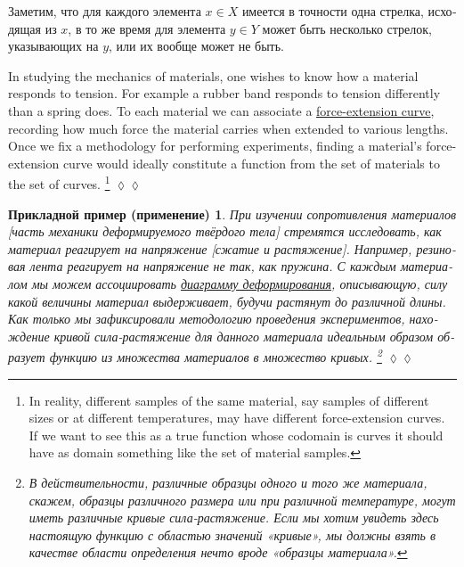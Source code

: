 \documentclass[a4paper]{book}
\theoremstyle{myth}
\newtheorem{appENG}[envENG]{\begin{english}Application\end{english}}
\newenvironment{applicationENG}{\begin{appENG}}{\hspace*{\fill}$\lozenge\lozenge$\end{appENG}}
\newtheorem{appRUS}[envRUS]{Прикладной пример (применение)}
\newenvironment{applicationRUS}{\begin{appRUS}}{\hspace*{\fill}$\lozenge\lozenge$\end{appRUS}}
\begin{document}
\begin{russian}
Заметим, что для каждого элемента $x\in X$ имеется в точности одна стрелка, исходящая из $x$, в то же время для элемента $y\in Y$ может быть несколько стрелок, указывающих на $y$, или их вообще может не быть.

\begin{applicationENG}\label{app:force-extension}
In studying the mechanics of materials, one wishes to know how a material responds to tension. For example a rubber band responds to tension differently than a spring does. To each material we can associate a \href{http://en.wikipedia.org/wiki/Stress–strain_curve}{\text force-extension curve}, recording how much force the material carries when extended to various lengths. Once we fix a methodology for performing experiments, finding a material's force-extension curve would ideally constitute a function from the set of materials to the set of curves.%
\footnote{In reality, different samples of the same material, say samples of different sizes or at different temperatures, may have different force-extension curves. If we want to see this as a true function whose codomain is curves it should have as domain something like the set of material samples.}
\end{applicationENG}

\begin{applicationRUS}\label{app:force-extension}
При изучении сопротивления материалов [часть механики деформируемого твёрдого тела] стремятся исследовать, как материал реагирует на напряжение [сжатие и растяжение]. Например, резиновая лента реагирует на напряжение не так, как пружина. С каждым материалом мы можем ассоциировать \href{https://ru.wikipedia.org/wiki/%D0%94%D0%B8%D0%B0%D0%B3%D1%80%D0%B0%D0%BC%D0%BC%D0%B0_%D0%B4%D0%B5%D1%84%D0%BE%D1%80%D0%BC%D0%B8%D1%80%D0%BE%D0%B2%D0%B0%D0%BD%D0%B8%D1%8F}{\text диаграмму деформирования}, описывающую, силу какой величины материал выдерживает, будучи растянут до различной длины. Как только мы зафиксировали методологию проведения экспериментов, нахождение кривой сила-растяжение для данного материала идеальным образом образует функцию из множества материалов в множество кривых.%
\footnote{В действительности, различные образцы одного и того же материала, скажем, образцы различного размера или при различной температуре, могут иметь различные кривые сила-растяжение. Если мы хотим увидеть здесь настоящую функцию с областью значений «кривые», мы должны взять в качестве области определения нечто вроде «образцы материала».} 
\end{applicationRUS}


\end{russian}
\end{document}
